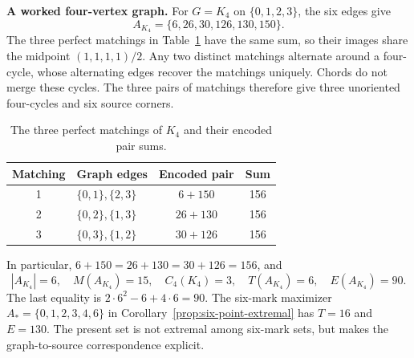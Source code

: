 \documentclass[11pt,a4paper]{article}
\newif\ifshowrevisions
\newcommand{\rev}[1]{{\ifshowrevisions\color{red}\fi #1}}
\newenvironment{revision}{\par\begingroup\ifshowrevisions\color{red}\fi}{\par\endgroup}
\theoremstyle{definition}
\numberwithin{equation}{section}
\begin{document}
\begin{revision}
\noindent\textbf{A worked four-vertex graph.}
For $G=K_4$ on $\{0,1,2,3\}$, the six edges give
\begin{equation}\label{eq:k4-worked-set}
A_{K_4}=\{6,26,30,126,130,150\}.
\end{equation}
The three perfect matchings in Table~\ref{tab:k4-worked} have the same sum, so their images share the midpoint $(1,1,1,1)/2$. Any two distinct matchings alternate around a four-cycle, whose alternating edges recover the matchings uniquely. Chords do not merge these cycles. The three pairs of matchings therefore give three unoriented four-cycles and six source corners.

\begin{table}[H]
\centering
\ifshowrevisions\color{red}\fi
\caption{\rev{The three perfect matchings of $K_4$ and their encoded pair sums.}}
\label{tab:k4-worked}
\begin{tabular}{@{}clcc@{}}
\toprule
Matching & Graph edges & Encoded pair & Sum\\\midrule
1 & $\{0,1\},\{2,3\}$ & $6+150$ & 156\\
2 & $\{0,2\},\{1,3\}$ & $26+130$ & 156\\
3 & $\{0,3\},\{1,2\}$ & $30+126$ & 156\\
\bottomrule
\end{tabular}
\end{table}

In particular, $6+150=26+130=30+126=156$, and
\begin{equation}\label{eq:k4-worked-counts}
|A_{K_4}|=6,\quad M(A_{K_4})=15,\quad C_4(K_4)=3,\quad
T(A_{K_4})=6,\quad E(A_{K_4})=90.
\end{equation}
The last equality is $2\cdot6^2-6+4\cdot6=90$. The six-mark maximizer $A_*=\{0,1,2,3,4,6\}$ in Corollary~\ref{prop:six-point-extremal} has $T=16$ and $E=130$. The present set is not extremal among six-mark sets, but makes the graph-to-source correspondence explicit.
\end{revision}
\end{document}

